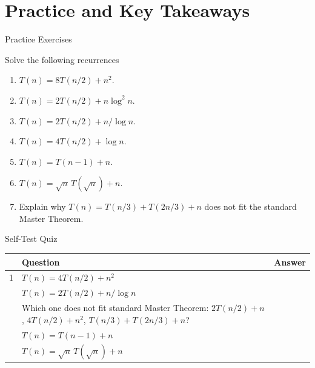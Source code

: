 \documentclass[aspectratio=169]{beamer}
\begin{document}
\section{Practice and Key Takeaways}

\begin{frame}{Practice Exercises}
  \small
  \begin{block}{Solve the following recurrences}
    \begin{enumerate}
      \item $T(n)=8T(n/2)+n^2$.
      \item $T(n)=2T(n/2)+n\log^2 n$.
      \item $T(n)=2T(n/2)+n/\log n$.
      \item $T(n)=4T(n/2)+\log n$.
      \item $T(n)=T(n-1)+n$.
      \item $T(n)=\sqrt n\,T(\sqrt n)+n$.
      \item Explain why $T(n)=T(n/3)+T(2n/3)+n$ does not fit the standard Master Theorem.
    \end{enumerate}
  \end{block}
\end{frame}

\begin{frame}{Self-Test Quiz}
  \scriptsize
  \begin{center}
    \renewcommand{\arraystretch}{1.18}
    \begin{tabular}{c|L{0.56\textwidth}|L{0.20\textwidth}}
      \toprule
      & \textbf{Question} & \textbf{Answer} \\
       & $T(n)=4T(n/2)+n^2$ & \\
       & $T(n)=2T(n/2)+n/\log n$ & \\
       & Which one does not fit standard Master Theorem: $2T(n/2)+n$, $4T(n/2)+n^2$, $T(n/3)+T(2n/3)+n$? & \\
       & $T(n)=T(n-1)+n$ & \\
       & $T(n)=\sqrt n\,T(\sqrt n)+n$ & \\
      \bottomrule
    \end{tabular}
  \end{center}
\end{frame}
\end{document}
